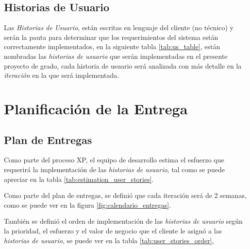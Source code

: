   \subsection{Historias de Usuario}
  \label{sub:historias_de_usuario}

    Las \emph{Historias de Usuario}, están escritas en lenguaje del cliente (no técnico) y serán la pauta para  determinar que los requerimientos del sistema están correctamente implementados, en la siguiente tabla \ref{tab:us_table}, están nombradas las \emph{historias de usuario} que serán implementadas en el presente proyecto de grado, cada historia de usuario será analizada con más detalle en la \emph{iteración} en la que será implementada. \\

    



  \section{Planificación de la Entrega}
  \label{sub:Planificación de la Entrega}


  \subsection{Plan de Entregas}

  Como parte del proceso XP, el equipo de desarrollo estima el esfuerzo que requerirá la implementación de las \emph{historias de usuario}, tal como se puede apreciar en la tabla \ref{tab:estimation_user_stories}.




    Como parte del plan de entregas, se definió que cada iteración será de 2 semanas, como se puede ver en la figura \ref{fig:calendario_entregas}.




       También se definió el orden de implementación de las  \emph{historias de usuario} según la  prioridad, el esfuerzo y el valor de negocio que el cliente le asignó a las \emph{historias de usuario}, se puede ver en la tabla \ref{tab:user_stories_order},

